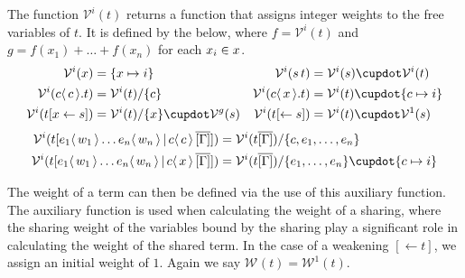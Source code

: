 \documentclass[runningheads]{llncs}
\let\vec\relax
\newcommand{\set}[1]{ \{ #1 \} }
\newcommand{\app}[2]{#1 \, #2}
\newcommand{\fake}[3]{#1 \langle \, #2 \, \rangle . #3}
\newcommand{\share}[3]{#1 [#2 \leftarrow #3]}
\newcommand{\dist}[5]{#1 [ #2 \, \vert \, \fakedist{#4}{#5} \, #3 ]}
\newcommand{\fakedist}[2]{#1 \langle \, #2 \, \rangle}
\newcommand{\weight}[2]{\mathcal{W}^{#1}(#2)}
\newcommand{\weightvar}[2]{\mathcal{V}^{#1}(#2)}
\begin{document}
\begin{definition}
The function $\weightvar{i}{t}$ returns a function that assigns integer weights to the free variables of $t$. It is defined by the below,  where $f = \weightvar{i}{t}$ and $g = f(x_{1}) + \dots + f(x_{n})$ for each $x_{i} \in \vec{x}$.
\begingroup
\allowdisplaybreaks
\begin{align*}
	\weightvar{i}{x} &= \set{x \mapsto i} &
	\weightvar{i}{\app{s}{t}} &= \weightvar{i}{s} \cupdot \weightvar{i}{t} \\
	\weightvar{i}{\fake{c}{c}{t}} &= \weightvar{i}{t} / \set{c} &
	\weightvar{i}{\fake{c}{\vec{x}}{t}} &= \weightvar{i}{t} \cupdot \set{c \mapsto i} \\
	\weightvar{i}{\share{t}{\vec{x}}{s}} &= \weightvar{i}{t} / \set{\vec{x}} \cupdot \weightvar{g}{s}  &
	\weightvar{i}{\share{t}{}{s}} &= \weightvar{i}{t} \cupdot \weightvar{1}{s} 
\end{align*}
\vspace{-0.8cm}
\begin{align*}
	\weightvar{i}{\dist{t}{\fakedist{e_{1}}{\vec{w_{1}}} \dots \fakedist{e_{n}}{\vec{w_{n}}}}{\overline{[\Gamma]}}{c}{c}} &= \weightvar{i}{t\overline{[\Gamma]}} / \set{c, e_{1}, \dots, e_{n}} \\
	\weightvar{i}{\dist{t}{\fakedist{e_{1}}{\vec{w_{1}}} \dots \fakedist{e_{n}}{\vec{w_{n}}}}{\overline{[\Gamma]}}{c}{\vec{x}}} &= \weightvar{i}{t\overline{[\Gamma]}} / \set{e_{1}, \dots, e_{n}} \cupdot \set{c \mapsto i}
\end{align*}
\endgroup
\end{definition}

\noindent The weight of a term can then be defined via the use of this auxiliary function. The auxiliary function is used when calculating the weight of a sharing, where the sharing weight of the variables bound by the sharing play a significant role in calculating the weight of the shared term. In the case of a weakening $[\leftarrow t]$, we assign an initial weight of $1$. Again we say $\weight{}{t} = \weight{1}{t}$.
\end{document}
